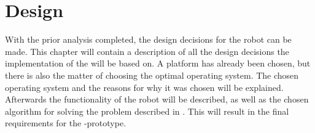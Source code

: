 \chapter{Design} \label{cha:design}

With the prior analysis completed, the design decisions for the robot can be made. This chapter will contain a description of all the design decisions the implementation of the \projname{} will be based on. A platform has already been chosen, but there is also the matter of choosing the optimal operating system. The chosen operating system and the reasons for why it was chosen will be explained. Afterwards the functionality of the robot will be described, as well as the chosen algorithm for solving the problem described in . This will result in the final requirements for the \projname{}-prototype.








